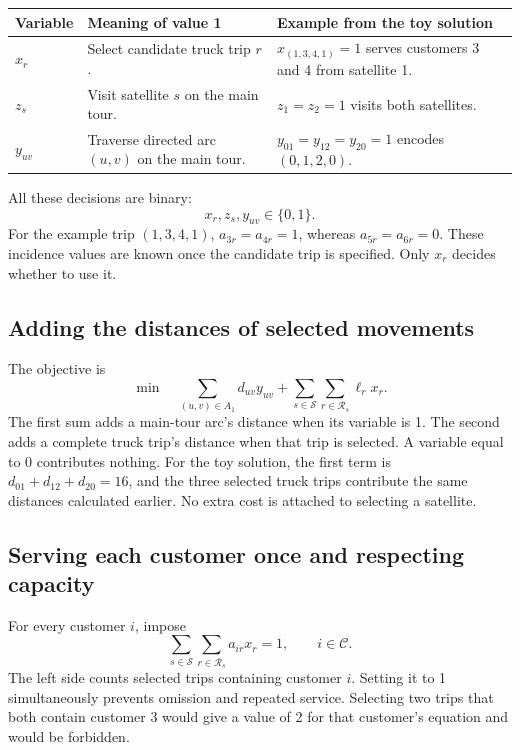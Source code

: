 \documentclass[11pt,a4paper]{article}
\newcommand{\R}{\mathcal R}\newcommand{\C}{\mathcal C}\newcommand{\Sats}{\mathcal S}
\begin{document}
\begin{center}\begin{tabular}{p{1.4cm}p{6.8cm}p{5.6cm}}\toprule
Variable & Meaning of value 1 & Example from the toy solution\\\midrule
$x_r$ & Select candidate truck trip $r$. & $x_{(1,3,4,1)}=1$ serves customers 3 and 4 from satellite 1.\\
$z_s$ & Visit satellite $s$ on the main tour. & $z_1=z_2=1$ visits both satellites.\\
$y_{uv}$ & Traverse directed arc $(u,v)$ on the main tour. & $y_{01}=y_{12}=y_{20}=1$ encodes $(0,1,2,0)$.\\\bottomrule
\end{tabular}\end{center}
All these decisions are binary:
\begin{equation}
x_r,z_s,y_{uv}\in\{0,1\}.
\label{eq:binary}
\end{equation}
For the example trip $(1,3,4,1)$, $a_{3r}=a_{4r}=1$, whereas $a_{5r}=a_{6r}=0$. These incidence values are known once the candidate trip is specified. Only $x_r$ decides whether to use it.

\subsection{Adding the distances of selected movements}
The objective is
\begin{equation}
\min\quad \sum_{(u,v)\in A_1}d_{uv}y_{uv}
  +\sum_{s\in\Sats}\sum_{r\in\R_s}\ell_r x_r.
\label{eq:obj}
\end{equation}
The first sum adds a main-tour arc's distance when its variable is 1. The second adds a complete truck trip's distance when that trip is selected. A variable equal to 0 contributes nothing. For the toy solution, the first term is $d_{01}+d_{12}+d_{20}=16$, and the three selected truck trips contribute the same distances calculated earlier. No extra cost is attached to selecting a satellite.

\subsection{Serving each customer once and respecting capacity}
For every customer $i$, impose
\begin{equation}
\sum_{s\in\Sats}\sum_{r\in\R_s}a_{ir}x_r=1,
\qquad i\in\C.
\label{eq:cover}
\end{equation}
The left side counts selected trips containing customer $i$. Setting it to 1 simultaneously prevents omission and repeated service. Selecting two trips that both contain customer 3 would give a value of 2 for that customer's equation and would be forbidden.
\end{document}
